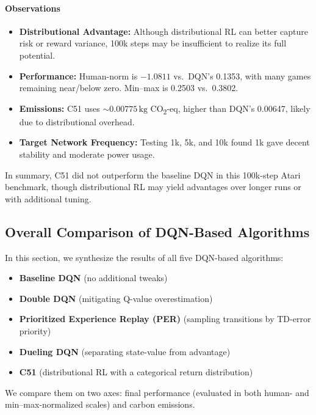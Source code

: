 \paragraph{Observations}
\begin{itemize}
	\item \textbf{Distributional Advantage:} 
	Although distributional RL can better capture risk or reward variance, 
	100k steps may be insufficient to realize its full potential.
	\item \textbf{Performance:} 
	Human-norm is $-1.0811$ vs.\ DQN’s 0.1353, with many games remaining near/below zero. 
	Min--max is 0.2503 vs.\ 0.3802.
	\item \textbf{Emissions:}
	C51 uses $\sim0.00775\,\mathrm{kg}$ CO\textsubscript{2}-eq, higher than DQN’s 0.00647, 
	likely due to distributional overhead.
	\item \textbf{Target Network Frequency:}
	Testing 1k, 5k, and 10k found 1k gave decent stability and moderate power usage.
\end{itemize}

In summary, C51 did not outperform the baseline DQN in this 100k-step Atari benchmark, 
though distributional RL may yield advantages over longer runs or with additional tuning.


\subsection{Overall Comparison of DQN-Based Algorithms}
\label{subsec:dqn_overall_comparison}

In this section, we synthesize the results of all five DQN-based algorithms:
\begin{itemize}
	\item \textbf{Baseline DQN} (no additional tweaks)
	\item \textbf{Double DQN} (mitigating Q-value overestimation)
	\item \textbf{Prioritized Experience Replay (PER)} (sampling transitions by TD-error priority)
	\item \textbf{Dueling DQN} (separating state-value from advantage)
	\item \textbf{C51} (distributional RL with a categorical return distribution)
\end{itemize}
We compare them on two axes: final performance (evaluated in both human- and min--max-normalized scales) and carbon emissions. 

